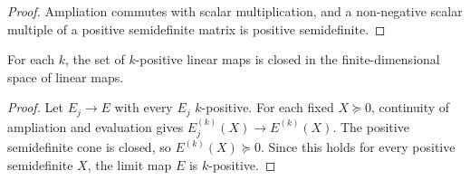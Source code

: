 \begin{proof}
    \leanok
    Ampliation commutes with scalar multiplication, and a non-negative scalar
    multiple of a positive semidefinite matrix is positive semidefinite.
\end{proof}

\begin{theorem}
    \label{thm:k_positive_closed}
    \leanok
    For each $k$, the set of $k$-positive linear maps is closed in the
    finite-dimensional space of linear maps.
\end{theorem}

\begin{proof}
    \leanok
    Let $E_j\to E$ with every $E_j$ $k$-positive. For each fixed
    $X\succeq0$, continuity of ampliation and evaluation gives
    $E_j^{(k)}(X)\to E^{(k)}(X)$. The positive semidefinite cone is closed, so
    $E^{(k)}(X)\succeq0$. Since this holds for every positive semidefinite
    $X$, the limit map $E$ is $k$-positive.
\end{proof}


